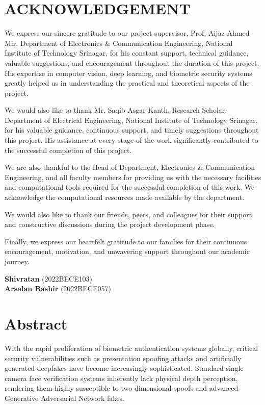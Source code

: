 \documentclass[12pt,a4paper]{report}
\begin{document}
\newpage

\chapter*{ACKNOWLEDGEMENT}

We express our sincere gratitude to our project supervisor, Prof. Aijaz Ahmed Mir, Department of Electronics \& Communication Engineering, National Institute of Technology Srinagar, for his constant support, technical guidance, valuable suggestions, and encouragement throughout the duration of this project. His expertise in computer vision, deep learning, and biometric security systems greatly helped us in understanding the practical and theoretical aspects of the project.

We would also like to thank Mr. Saqib Asgar Kanth, Research Scholar, Department of Electrical Engineering, National Institute of Technology Srinagar, for his valuable guidance, continuous support, and timely suggestions throughout this project. His assistance at every stage of the work significantly contributed to the successful completion of this project.

We are also thankful to the Head of Department, Electronics \& Communication Engineering, and all faculty members for providing us with the necessary facilities and computational tools required for the successful completion of this work. We acknowledge the computational resources made available by the department.

We would also like to thank our friends, peers, and colleagues for their support and constructive discussions during the project development phase.

Finally, we express our heartfelt gratitude to our families for their continuous encouragement, motivation, and unwavering support throughout our academic journey.

\vspace{1.5cm}
\begin{flushright}
\textbf{Shivratan} (2022BECE103)\\
\textbf{Arsalan Bashir} (2022BECE057)\\
\end{flushright}

\newpage

\chapter*{Abstract}
With the rapid proliferation of biometric authentication systems globally, critical security vulnerabilities such as presentation spoofing attacks and artificially generated deepfakes have become increasingly sophisticated. Standard single camera face verification systems inherently lack physical depth perception, rendering them highly susceptible to two dimensional spoofs and advanced Generative Adversarial Network fakes. 
\end{document}
